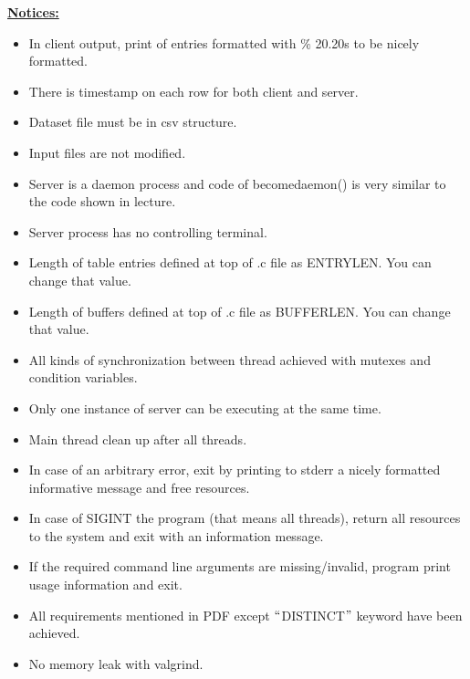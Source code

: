 \documentclass[12pt]{report}
\renewcommand{\_}{\kern-1.5pt\textunderscore\kern-1.5pt}
\begin{document}
\vspace{\baselineskip}
\vspace{\baselineskip}
\begin{FlushLeft}
{\fontsize{16pt}{19.2pt}\selectfont \textbf{\uline{Notices:}}}
\end{FlushLeft}
\setlength{\parskip}{0.0pt}
\begin{itemize}
	\item In client output, print of entries formatted with $\%$ 20.20s to be nicely formatted.
	\item There is timestamp on each row for both client and server.
\setlength{\parskip}{8.04pt}
	\item Dataset file must be in csv structure. 
	\item Input files are not modified.
	\item Server is a daemon process and code of become\_daemon() is very similar to the code shown in lecture.
	\item Server process has no controlling terminal.
	\item Length of table entries defined at top of .c file as ENTRY\_LEN. You can change that value. 
	\item Length of buffers defined at top of .c file as BUFFER\_LEN. You can change that value.
	\item All kinds of synchronization between thread achieved with mutexes and condition variables. 
	\item Only one instance of server can be executing at the same time.
	\item Main thread clean up after all threads. 
	\item In case of an arbitrary error, exit by printing to stderr a nicely formatted informative message and free resources. 
	\item In case of SIGINT the program (that means all threads), return all resources to the system and exit with an information message. 
	\item If the required command line arguments are missing/invalid, program print usage information and exit. 
	\item All requirements mentioned in PDF except $``$DISTINCT$"$  keyword have been achieved.
	\item No memory leak with valgrind.
\end{itemize}
\vspace{\baselineskip}
\end{document}
